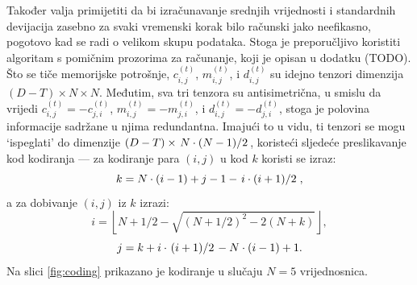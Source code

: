 \documentclass[lmodern, utf8, diplomski, numeric]{fer}
\begin{document}
  Također valja primijetiti da bi izračunavanje srednjih vrijednosti i standardnih devijacija zasebno za svaki vremenski korak bilo računski jako neefikasno, pogotovo kad se radi o velikom skupu podataka.
  Stoga je preporučljivo koristiti algoritam s pomičnim prozorima za računanje, koji je opisan u dodatku (TODO).
  Što se tiče memorijske potrošnje, $c_{i,j}^{(t)}$, $m_{i,j}^{(t)}$, i $d_{i,j}^{(t)}$ su idejno tenzori dimenzija $(D - T) \times N \times N$.
  Međutim, sva tri tenzora su antisimetrična, u smislu da vrijedi $c_{i,j}^{(t)} = -c_{j,i}^{(t)}$, $m_{i,j}^{(t)} = -m_{j,i}^{(t)}$, i $d_{i,j}^{(t)} = -d_{j,i}^{(t)}$, stoga je polovina informacije sadržane u njima redundantna.
  Imajući to u vidu, ti tenzori se mogu `ispeglati' do dimenzije $(D - T) \times \left. N\cdot(N - 1) \middle/ 2\right.$, koristeći sljedeće preslikavanje kod kodiranja --- za kodiranje para $(i,j)$ u kod $k$ koristi se izraz:
  \begin{equation} k = N \cdot (i - 1) + j - 1 - \left. i \cdot (i + 1) \middle/ 2\right., \end{equation}
  a za dobivanje $(i, j)$ iz $k$ izrazi:
  \begin{equation} i = \left\lfloor N + 1/2 - \sqrt{(N + 1/2)^2 - 2(N + k)} \right\rfloor, \end{equation}
  \begin{equation} j = k + i \cdot \left.(i + 1) \middle/ 2\right. - N \cdot (i - 1) + 1. \end{equation}
  Na slici \ref{fig:coding} prikazano je kodiranje u slučaju $N = 5$ vrijednosnica.
  
\end{document}
